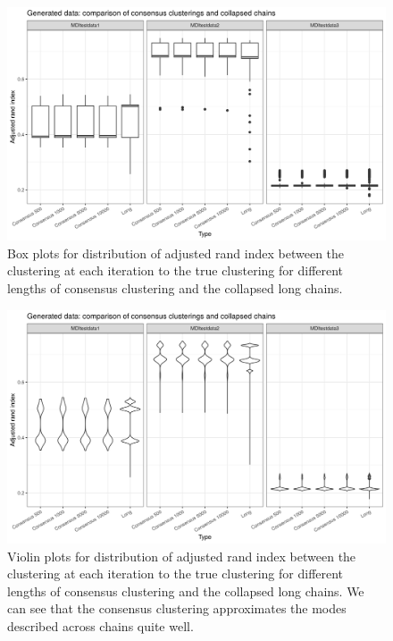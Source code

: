 \documentclass[14pt]{extarticle} %
\begin{document}

	\begin{figure}[!htb]
		\centering
		\includegraphics[scale=0.65]{Images/Gen_data/Case_2/box_plot_ari_true_clustering_collapsed_long.png}
		\caption{Box plots for distribution of adjusted rand index between the clustering at each iteration to the true clustering for different lengths of consensus clustering and the collapsed long chains.}
		\label{fig:gen_data_case_2_collapsed_boxplot}
	\end{figure}
	

	\begin{figure}[h]
		\centering
		\includegraphics[scale=0.65]{Images/Gen_data/Case_2/violin_plot_ari_true_clustering_collapsed_long.png}
		\caption{Violin plots for distribution of adjusted rand index between the clustering at each iteration to the true clustering for different lengths of consensus clustering and the collapsed long chains. We can see that the consensus clustering approximates the modes described across chains quite well.}
		\label{fig:gen_data_case_2_collapsed_violin_plot}
	\end{figure}
\end{document}
